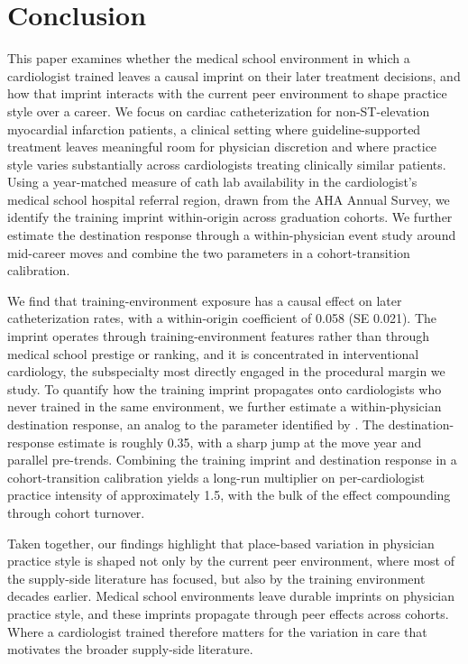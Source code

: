 \documentclass[12pt]{article}
\let\textcite\citet
\begin{document}
\section{Conclusion}\label{sec:conclusion}

This paper examines whether the medical school environment in which a cardiologist trained leaves a causal imprint on their later treatment decisions, and how that imprint interacts with the current peer environment to shape practice style over a career. We focus on cardiac catheterization for non-ST-elevation myocardial infarction patients, a clinical setting where guideline-supported treatment leaves meaningful room for physician discretion and where practice style varies substantially across cardiologists treating clinically similar patients. Using a year-matched measure of cath lab availability in the cardiologist's medical school hospital referral region, drawn from the AHA Annual Survey, we identify the training imprint within-origin across graduation cohorts. We further estimate the destination response through a within-physician event study around mid-career moves and combine the two parameters in a cohort-transition calibration.

We find that training-environment exposure has a causal effect on later catheterization rates, with a within-origin coefficient of 0.058 (SE 0.021). The imprint operates through training-environment features rather than through medical school prestige or ranking, and it is concentrated in interventional cardiology, the subspecialty most directly engaged in the procedural margin we study. To quantify how the training imprint propagates onto cardiologists who never trained in the same environment, we further estimate a within-physician destination response, an analog to the parameter identified by \textcite{molitor2018}. The destination-response estimate is roughly 0.35, with a sharp jump at the move year and parallel pre-trends. Combining the training imprint and destination response in a cohort-transition calibration yields a long-run multiplier on per-cardiologist practice intensity of approximately 1.5, with the bulk of the effect compounding through cohort turnover.

Taken together, our findings highlight that place-based variation in physician practice style is shaped not only by the current peer environment, where most of the supply-side literature has focused, but also by the training environment decades earlier. Medical school environments leave durable imprints on physician practice style, and these imprints propagate through peer effects across cohorts. Where a cardiologist trained therefore matters for the variation in care that motivates the broader supply-side literature.
\end{document}

